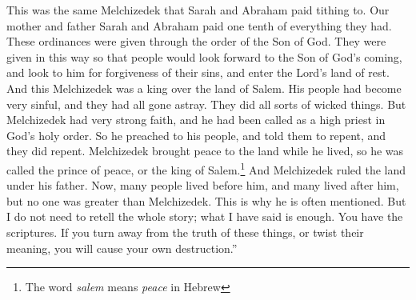This was the same Melchizedek that Sarah and Abraham paid tithing to. Our mother and father Sarah and Abraham paid one tenth of everything they had.
\bverse \iffalse Now these ordinances were given after this manner, that thereby the people might look forward on the Son of God, it being a type of his order, or it being his order, and this that they might look forward to him for a remission of their sins, that they might enter into the rest of the Lord. \fi
These ordinances were given through the order of the Son of God. They were given in this way so that people would look forward to the Son of God's coming, and look to him for forgiveness of their sins, and enter the Lord's land of rest.
\bverse \iffalse Now this Melchizedek was a king over the land of Salem; and his people had waxed strong in iniquity and abomination; yea, they had all gone astray; they were full of all manner of wickedness; \fi
And this Melchizedek was a king over the land of Salem. His people had become very sinful, and they had all gone astray. They did all sorts of wicked things.
\bverse \iffalse But Melchizedek having exercised mighty faith, and received the office of the high priesthood according to the holy order of God, did preach repentance unto his people. And behold, they did repent; and Melchizedek did establish peace in the land in his days; therefore he was called the prince of peace, for he was the king of Salem; and he did reign under his father. \fi
But Melchizedek had very strong faith, and he had been called as a high priest in God's holy order. So he preached to his people, and told them to repent, and they did repent. Melchizedek brought peace to the land while he lived, so he was called the prince of peace, or the king of Salem.\footnote{The word \textit{salem} means \textit{peace} in Hebrew} And Melchizedek ruled the land under his father.
\bverse \iffalse Now, there were many before him, and also there were many afterwards, but none were greater; therefore, of him they have more particularly made mention. \fi
Now, many people lived before him, and many lived after him, but no one was greater than Melchizedek. This is why he is often mentioned.
\bverse \iffalse Now I need not rehearse the matter; what I have said may suffice. Behold, the scriptures are before you; if ye will wrest them it shall be to your own destruction. \fi
But I do not need to retell the whole story; what I have said is enough. You have the scriptures. If you turn away from the truth of these things, or twist their meaning, you will cause your own destruction.''

